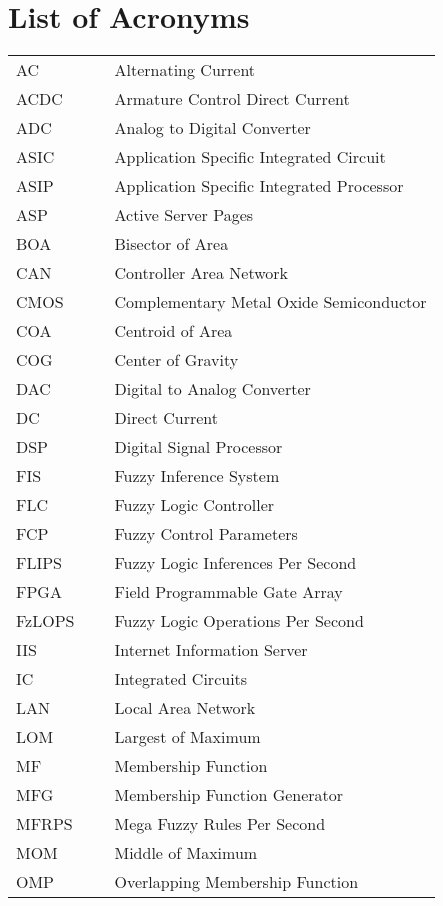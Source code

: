 \chapter{List of Acronyms}

\begin{table}[ht]
	\centering
	\begin{tabular}{l l l}
		AC & ~ & Alternating Current \\
		ACDC & ~ & Armature Control Direct Current \\
		ADC & ~ & Analog to Digital Converter \\
		ASIC & ~ & Application Specific Integrated Circuit \\
		ASIP & ~ & Application Specific Integrated Processor \\
		ASP & ~ & Active Server Pages \\
		BOA & ~ & Bisector of Area \\
		CAN & ~ & Controller Area Network \\
		CMOS & ~ & Complementary Metal Oxide Semiconductor \\
		COA & ~ & Centroid of Area \\
		COG & ~ & Center of Gravity \\
		DAC & ~ & Digital to Analog Converter \\
		DC & ~ & Direct Current \\
		DSP & ~ & Digital Signal Processor \\
		FIS & ~ & Fuzzy Inference System \\
		FLC & ~ & Fuzzy Logic Controller \\
		FCP & ~ & Fuzzy Control Parameters \\
		FLIPS & ~ & Fuzzy Logic Inferences Per Second \\
		FPGA & ~ & Field Programmable Gate Array \\
		FzLOPS & ~ & Fuzzy Logic Operations Per Second \\
		IIS & ~ & Internet Information Server \\
		IC & ~ & Integrated Circuits \\
		LAN & ~ & Local Area Network \\
		LOM & ~ & Largest of Maximum \\
		MF & ~ & Membership Function \\
		MFG & ~ & Membership Function Generator \\
		MFRPS & ~ & Mega Fuzzy Rules Per Second \\
		MOM & ~ & Middle of Maximum \\
		OMP & ~ & Overlapping Membership Function
	\end{tabular}
\end{table}


